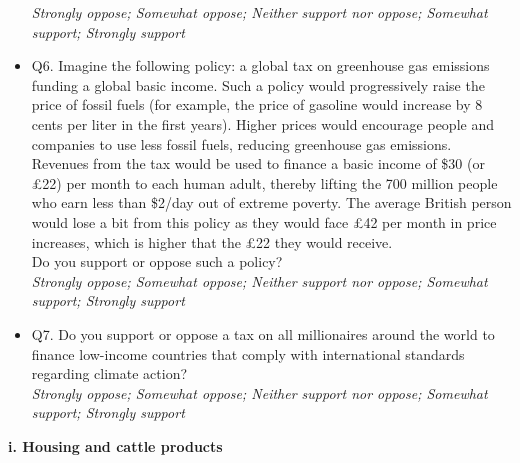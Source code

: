 \documentclass{article}
\begin{document}
\begin{itemize}
    \textit{Strongly oppose; Somewhat oppose; Neither support nor oppose; Somewhat support; Strongly support}
    \item Q6. Imagine the following policy: a global tax on greenhouse gas emissions funding a global basic income.
    Such a policy would progressively raise the price of fossil fuels (for example, the price of gasoline would increase by 8 cents per liter in the first years). Higher prices would encourage people and companies to use less fossil fuels, reducing greenhouse gas emissions. Revenues from the tax would be used to finance a basic income of \$30 (or £22) per month to each human adult, thereby lifting the 700 million people who earn less than \$2/day out of extreme poverty.
    The average British person would lose a bit from this policy as they would face £42 per month in price increases, which is higher that the £22 they would receive. \\
    Do you support or oppose such a policy?  \\
    \textit{Strongly oppose; Somewhat oppose; Neither support nor oppose; Somewhat support; Strongly support}
    \item Q7. Do you support or oppose a tax on all millionaires around the world to finance low-income countries that comply with international standards regarding climate action?  \\
    \textit{Strongly oppose; Somewhat oppose; Neither support nor oppose; Somewhat support; Strongly support}
\end{itemize}

\begin{flushleft}
\textbf{i. Housing and cattle products}
\end{flushleft}
\end{document}

